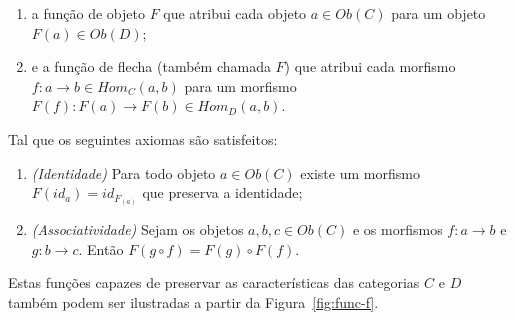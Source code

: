 \documentclass[10pt, conference]{IEEEtran}
\begin{document}
\begin{enumerate}[label=(\alph*), leftmargin=3em, topsep = 0pt, itemsep = 1ex, partopsep = 1ex, parsep = 1ex]
	\item a função de objeto $F$ que atribui cada objeto $a \in Ob(C)$ para um objeto $F(a) \in Ob(D)$;
	\item e a função de flecha (também chamada $F$) que atribui cada morfismo $f: a \rightarrow b \in Hom_C(a, b)$ para um morfismo $F(f):F(a) \rightarrow F(b) \in Hom_D(a, b)$.
\end{enumerate}

\bigskip

Tal que os seguintes axiomas são satisfeitos:

\begin{enumerate}[label={}, leftmargin = 2em, topsep = 0pt, itemsep = 1ex,partopsep = 1ex, parsep = 1ex]
	\item \textit{(Identidade)} Para todo objeto $a \in Ob(C)$ existe um morfismo $F(id_a) = id_{F_{(a)}}$ que preserva a identidade;
	\item \textit{(Associatividade)} Sejam os objetos $a, b, c \in Ob(C)$ e os morfismos $f: a \rightarrow b$ e $g: b \rightarrow c$. Então $F(g \circ  f) = F(g) \circ F(f)$.
\end{enumerate}

\bigskip

Estas funções capazes de preservar as características das categorias $C$ e $D$ também podem ser ilustradas a partir da Figura~\ref{fig:func-f}.
\end{document}
